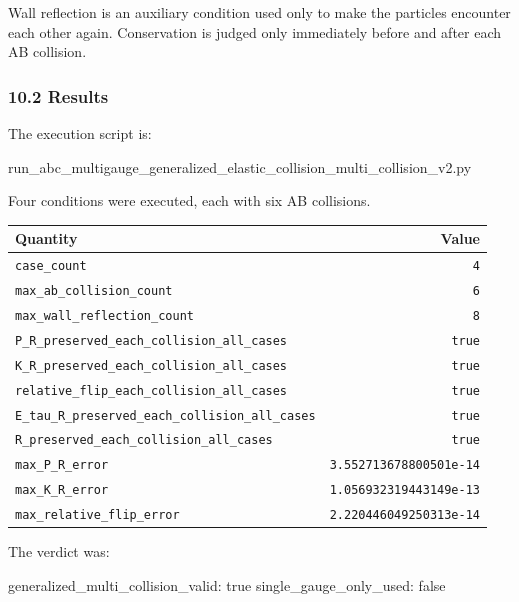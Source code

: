 \documentclass[
  a4paper,
]{article}
\newenvironment{Shaded}{}{}
\newcommand{\NormalTok}[1]{#1}
\newcounter{none} %
\begin{document}
Wall reflection is an auxiliary condition used only to make the
particles encounter each other again. Conservation is judged only
immediately before and after each AB collision.

\subsubsection{10.2 Results}\label{results-2}

The execution script is:

\begin{Shaded}
\begin{Highlighting}[]
\NormalTok{run\_abc\_multigauge\_generalized\_elastic\_collision\_multi\_collision\_v2.py}
\end{Highlighting}
\end{Shaded}

Four conditions were executed, each with six AB collisions.

{\def\LTcaptype{none} %
\begin{longtable}[]{@{}lr@{}}
\toprule\noalign{}
Quantity & Value \\
\midrule\noalign{}
\endhead
\bottomrule\noalign{}
\endlastfoot
\texttt{case\_count} & \texttt{4} \\
\texttt{max\_ab\_collision\_count} & \texttt{6} \\
\texttt{max\_wall\_reflection\_count} & \texttt{8} \\
\texttt{P\_R\_preserved\_each\_collision\_all\_cases} & \texttt{true} \\
\texttt{K\_R\_preserved\_each\_collision\_all\_cases} & \texttt{true} \\
\texttt{relative\_flip\_each\_collision\_all\_cases} & \texttt{true} \\
\texttt{E\_tau\_R\_preserved\_each\_collision\_all\_cases} &
\texttt{true} \\
\texttt{R\_preserved\_each\_collision\_all\_cases} & \texttt{true} \\
\texttt{max\_P\_R\_error} & \texttt{3.552713678800501e-14} \\
\texttt{max\_K\_R\_error} & \texttt{1.056932319443149e-13} \\
\texttt{max\_relative\_flip\_error} & \texttt{2.220446049250313e-14} \\
\end{longtable}
}

The verdict was:

\begin{Shaded}
\begin{Highlighting}[]
\NormalTok{generalized\_multi\_collision\_valid: true}
\NormalTok{single\_gauge\_only\_used: false}
\end{Highlighting}
\end{Shaded}
\end{document}
